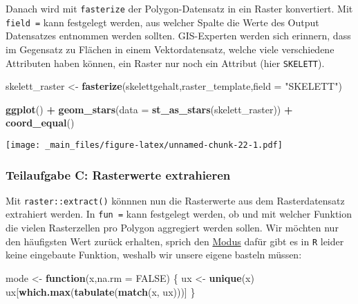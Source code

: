 \documentclass[]{book}
\newenvironment{Shaded}{\begin{snugshade}}{\end{snugshade}}
\newcommand{\ControlFlowTok}[1]{\textcolor[rgb]{0.13,0.29,0.53}{\textbf{#1}}}
\newcommand{\DataTypeTok}[1]{\textcolor[rgb]{0.13,0.29,0.53}{#1}}
\newcommand{\KeywordTok}[1]{\textcolor[rgb]{0.13,0.29,0.53}{\textbf{#1}}}
\newcommand{\NormalTok}[1]{#1}
\newcommand{\OperatorTok}[1]{\textcolor[rgb]{0.81,0.36,0.00}{\textbf{#1}}}
\newcommand{\OtherTok}[1]{\textcolor[rgb]{0.56,0.35,0.01}{#1}}
\newcommand{\StringTok}[1]{\textcolor[rgb]{0.31,0.60,0.02}{#1}}
\begin{document}
Danach wird mit \texttt{fasterize} der Polygon-Datensatz in ein Raster konvertiert. Mit \texttt{field\ =} kann festgelegt werden, aus welcher Spalte die Werte des Output Datensatzes entnommen werden sollten. GIS-Experten werden sich erinnern, dass im Gegensatz zu Flächen in einem Vektordatensatz, welche viele verschiedene Attributen haben können, ein Raster nur noch ein Attribut (hier \texttt{SKELETT}).

\begin{Shaded}
\begin{Highlighting}[]
\NormalTok{skelett_raster <-}\StringTok{ }\KeywordTok{fasterize}\NormalTok{(skelettgehalt,raster_template,}\DataTypeTok{field =} \StringTok{"SKELETT"}\NormalTok{)}

\KeywordTok{ggplot}\NormalTok{() }\OperatorTok{+}\StringTok{ }
\StringTok{  }\KeywordTok{geom_stars}\NormalTok{(}\DataTypeTok{data =} \KeywordTok{st_as_stars}\NormalTok{(skelett_raster)) }\OperatorTok{+}
\StringTok{  }\KeywordTok{coord_equal}\NormalTok{()}
\end{Highlighting}
\end{Shaded}

\texttt{[image: \_main\_files/figure-latex/unnamed-chunk-22-1.pdf]}

\hypertarget{teilaufgabe-c-rasterwerte-extrahieren}{%
\subsubsection{Teilaufgabe C: Rasterwerte extrahieren}\label{teilaufgabe-c-rasterwerte-extrahieren}}

Mit \texttt{raster::extract()} könnnen nun die Rasterwerte aus dem Rasterdatensatz extrahiert werden. In \texttt{fun\ =} kann festgelegt werden, ob und mit welcher Funktion die vielen Rasterzellen pro Polygon aggregiert werden sollen. Wir möchten nur den häufigsten Wert zurück erhalten, sprich den \href{https://de.wikipedia.org/wiki/Modus_(Statistik)}{Modus} dafür gibt es in \texttt{R} leider keine eingebaute Funktion, weshalb wir unsere eigene basteln müssen:

\begin{Shaded}
\begin{Highlighting}[]
\NormalTok{mode <-}\StringTok{ }\ControlFlowTok{function}\NormalTok{(x,}\DataTypeTok{na.rm =} \OtherTok{FALSE}\NormalTok{) \{}
\NormalTok{  ux <-}\StringTok{ }\KeywordTok{unique}\NormalTok{(x)}
\NormalTok{  ux[}\KeywordTok{which.max}\NormalTok{(}\KeywordTok{tabulate}\NormalTok{(}\KeywordTok{match}\NormalTok{(x, ux)))]}
\NormalTok{\}}
\end{Highlighting}
\end{Shaded}
\end{document}
